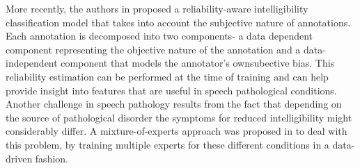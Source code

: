 \documentclass{article}
\begin{document}
More recently, the authors in \cite{kumar2015maxentrel} proposed a reliability-aware intelligibility classification model that takes into account the subjective nature of annotations. Each annotation is decomposed into two components- a data dependent component representing the objective nature of the annotation and a data-independent component that models the annotator's ownsubective bias. This reliability estimation can be performed at the time of training and can help provide insight into features that are useful in speech pathological conditions.
Another challenge in speech pathology results from the fact that depending on the source of pathological disorder the symptoms for reduced intelligibility might considerably differ. A mixture-of-experts approach was proposed in \cite{gupta2014pathology} to deal with this problem, by training multiple experts for these different conditions in a data-driven fashion.
\end{document}
